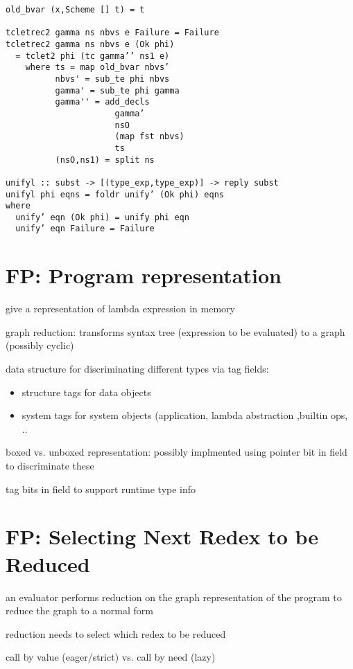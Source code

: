 \documentclass[8pt]{extarticle}
\begin{document}
\begin{multicols*}{2}
\begin{verbatim}
old_bvar (x,Scheme [] t) = t

tcletrec2 gamma ns nbvs e Failure = Failure
tcletrec2 gamma ns nbvs e (Ok phi)
  = tclet2 phi (tc gamma’’ ns1 e)
    where ts = map old_bvar nbvs’
          nbvs' = sub_te phi nbvs
          gamma' = sub_te phi gamma
          gamma'' = add_decls
                      gamma’
                      nsO
                      (map fst nbvs)
                      ts
          (nsO,ns1) = split ns

unifyl :: subst -> [(type_exp,type_exp)] -> reply subst
unifyl phi eqns = foldr unify’ (Ok phi) eqns
where
  unify’ eqn (Ok phi) = unify phi eqn
  unify’ eqn Failure = Failure
\end{verbatim}

\vfill\null
\columnbreak

\section{FP: Program representation}

give a representation of lambda expression in memory

graph reduction: transforms syntax tree (expression to be evaluated) to a graph (possibly cyclic)

data structure for discriminating different types via tag fields:
\begin{itemize}
\item structure tags for data objects
\item system tags for system objects (application, lambda abstraction ,builtin ops, ..
\end{itemize}

boxed vs. unboxed representation: possibly implmented using pointer bit in field to discriminate these

tag bits in field to support runtime type info

\vfill\null
\columnbreak

\section{FP: Selecting Next Redex to be Reduced}

an evaluator performs reduction on the graph representation of the program to reduce the graph to a normal form

reduction needs to select which redex to be reduced

call by value (eager/strict) vs. call by need (lazy)


\end{multicols*}
\end{document}

